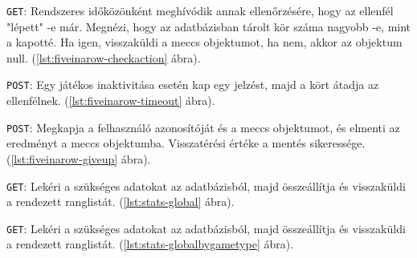 \texttt{GET}: Rendszeres időközönként meghívódik annak ellenőrzésére, hogy az ellenfél "lépett" -e már. Megnézi, hogy az adatbázisban tárolt kör száma nagyobb -e, mint a kapotté. Ha igen, visszaküldi a meccs objektumot, ha nem, akkor az objektum null. (\ref{lst:fiveinarow-checkaction} ábra).



\texttt{POST}: Egy játékos inaktivitása esetén kap egy jelzést, majd a kört átadja az ellenfélnek. (\ref{lst:fiveinarow-timeout} ábra).



\texttt{POST}: Megkapja a felhasználó azonosítóját és a meccs objektumot, és elmenti az eredményt a meccs objektumba. Visszatérési értéke a mentés sikeressége. (\ref{lst:fiveinarow-giveup} ábra).












\texttt{GET}: Lekéri a szükséges adatokat az adatbázisból, majd összeállítja és visszaküldi a rendezett ranglistát. (\ref{lst:stats-global} ábra).



\texttt{GET}: Lekéri a szükséges adatokat az adatbázisból, majd összeállítja és visszaküldi a rendezett ranglistát. (\ref{lst:stats-globalbygametype} ábra).



